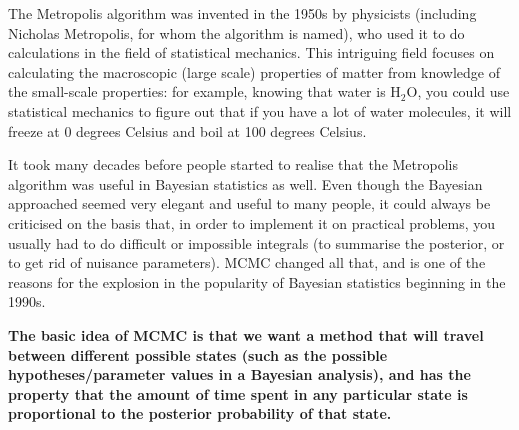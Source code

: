 The Metropolis algorithm was invented in the 1950s by physicists
(including Nicholas Metropolis, for whom the algorithm is named), who used it
to do calculations in the field of statistical mechanics. This intriguing field
focuses on calculating the macroscopic (large scale) properties of matter from
knowledge of the small-scale properties: for example, knowing that water is
H$_2$O, you could use statistical mechanics to figure out that if you have a lot
of water molecules, it will freeze at 0 degrees Celsius and boil at 100 degrees
Celsius.

It took
many decades before people started to realise that the Metropolis algorithm was useful in Bayesian
statistics as well. Even though the Bayesian approached seemed very elegant and
useful to many people, it could always be criticised on the basis that, in order
to implement it on practical problems, you usually had to do difficult or
impossible integrals (to summarise the posterior, or to get rid of nuisance
parameters). MCMC changed all that, and is one of the reasons for the
explosion in the popularity of Bayesian statistics beginning in the 1990s.

\begin{framed}
{\bf
The basic idea of MCMC is that we want a method that will travel between
different possible states (such as the possible hypotheses/parameter values in
a Bayesian analysis), and has the property that the amount of time spent in
any particular state is proportional to the posterior probability of that state.}
\end{framed}

